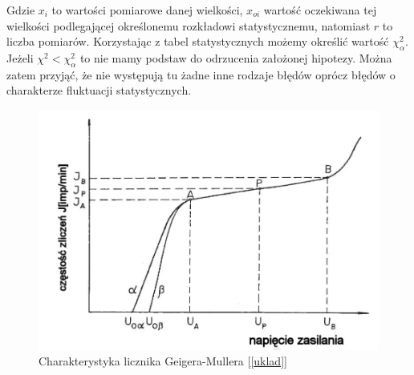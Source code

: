 \documentclass{article}
\begin{document}
Gdzie $x_i$ to wartości pomiarowe danej wielkości, $x_{oi}$ wartość oczekiwana tej wielkości podlegającej określonemu rozkładowi statystycznemu, natomiast $r$ to liczba pomiarów. Korzystając z tabel statystycznych możemy określić wartość $\chi^2_\alpha$. Jeżeli $\chi^2 < \chi^2_\alpha$ to nie mamy podstaw do odrzucenia założonej hipotezy. Można zatem przyjąć, że nie występują tu żadne inne rodzaje błędów oprócz błędów o charakterze fluktuacji statystycznych.
\begin{figure}[h!]
	\centering
	\label{charakterystyka}
	\includegraphics[width = 0.5\linewidth]{images/charakterystyka}
	\caption{Charakterystyka licznika Geigera-Mullera [\ref{uklad}]}
\end{figure}
\end{document}
